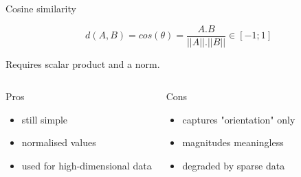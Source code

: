 \documentclass{beamer}
\begin{document}
\begin{frame}{Cosine similarity}

$$d(A,B)= cos(\theta)= \frac{A.B}{||A||.||B||} \in[-1;1]$$

Requires \alert{scalar product}  and a \alert{norm}.


\begin{scriptsize}
\begin{columns}[T,onlytextwidth]
\begin{block}{Pros}
\begin{itemize}
  \item still simple
  \item normalised values
  \item used for high-dimensional data
\end{itemize}
\end{block}
\begin{block}{Cons}
\begin{spacing}{0.9}
\begin{itemize}
  \item captures "orientation" only
  \item magnitudes  meaningless
  \item degraded by sparse data 
\end{itemize}
\end{spacing}
\end{block}
\end{columns}
\end{scriptsize}



\end{frame}
\end{document}
